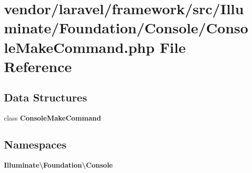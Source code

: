 \section{vendor/laravel/framework/src/\+Illuminate/\+Foundation/\+Console/\+Console\+Make\+Command.php File Reference}
\label{_console_make_command_8php}
\subsection*{Data Structures}
\begin{DoxyCompactItemize}
\item 
class {\bf Console\+Make\+Command}
\end{DoxyCompactItemize}
\subsection*{Namespaces}
\begin{DoxyCompactItemize}
\item 
 {\bf Illuminate\textbackslash{}\+Foundation\textbackslash{}\+Console}
\end{DoxyCompactItemize}
